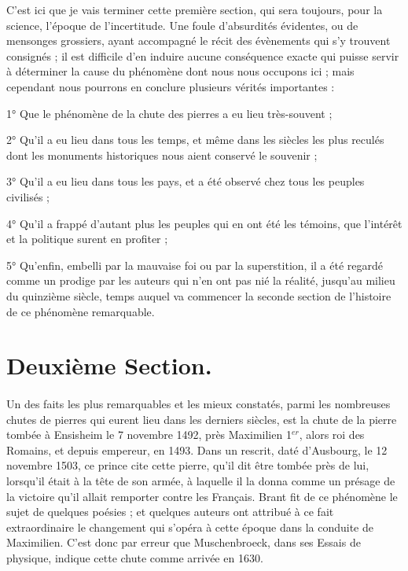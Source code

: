 \documentclass[a4paper, 12pt, oneside, french]{article}
\begin{document}
C'est ici que je vais terminer cette première section, qui sera toujours, pour la science, l'époque de l'incertitude. Une foule d'absurdités évidentes, ou de mensonges grossiers, ayant accompagné le récit des évènements qui s'y trouvent consignés ; il est difficile d'en induire aucune conséquence exacte qui puisse servir à déterminer la cause du phénomène dont nous nous occupons ici ; mais cependant nous pourrons en conclure plusieurs vérités importantes :

1° Que le phénomène de la chute des pierres a eu lieu très-souvent ;

2° Qu'il a eu lieu dans tous les temps, et même dans les siècles les plus reculés dont les monuments historiques nous aient conservé le souvenir ;

3° Qu'il a eu lieu dans tous les pays, et a été observé chez tous les peuples civilisés ;

4° Qu'il a frappé d'autant plus les peuples qui en ont été les témoins, que l'intérêt et la politique surent en profiter ;

5° Qu'enfin, embelli par la mauvaise foi ou par la superstition, il a été regardé comme un prodige par les auteurs qui n'en ont pas nié la réalité, jusqu'au milieu du quinzième siècle, temps auquel va commencer la seconde section de l'histoire de ce phénomène remarquable.
\clearpage
\section{Deuxième Section.}
\paragraph{}
Un des faits les plus remarquables et les mieux constatés, parmi les nombreuses chutes de pierres qui eurent lieu dans les derniers siècles, est la chute de la pierre tombée à Ensisheim le 7 novembre 1492, près Maximilien 1$^{er}$, alors roi des Romains, et depuis empereur, en 1493. Dans un rescrit, daté d'Ausbourg, le 12 novembre 1503, ce prince cite cette pierre, qu'il dit être tombée près de lui, lorsqu'il était à la tête de son armée, à laquelle il la donna comme un présage de la victoire qu'il allait remporter contre les Français. Brant fit de ce phénomène le sujet de quelques poésies ; et quelques auteurs ont attribué à ce fait extraordinaire le changement qui s'opéra à cette époque dans la conduite de Maximilien. C'est donc par erreur que Muschenbroeck, dans ses Essais de physique, indique cette chute comme arrivée en 1630.
\end{document}
